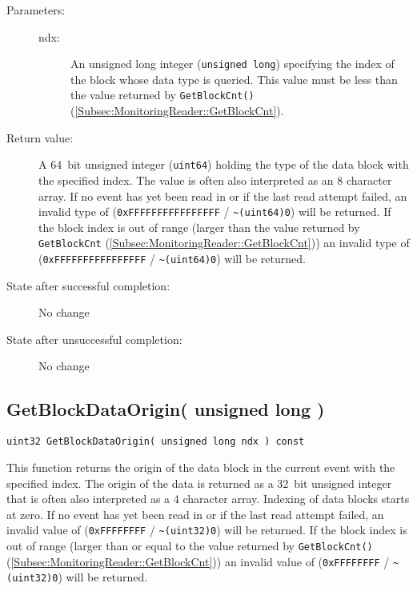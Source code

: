 \documentclass[a4paper,twoside]{article}
\begin{document}
\begin{description}
\item[Parameters:]
	\begin{description}
		\item[ndx:] An unsigned long integer (\texttt{unsigned long}) specifying the index of the block whose data type is queried.
		This value must be less than the value returned by \texttt{GetBlockCnt()} (\ref{Subsec:MonitoringReader::GetBlockCnt}).
	\end{description}
\item[Return value:] A 64~bit unsigned integer (\texttt{uint64}) holding the type of the data block with the specified index. The value is often also interpreted as an 8 
character array.
If no event has yet been read in or if the last read attempt failed, an invalid type of (\texttt{0xFF\-FF\-FF\-FF\-FF\-FF\-FF\-FF} / \texttt{\~{ }(uint64)0}) 
will be returned.
If the block index is out of range (larger than the value returned by \texttt{GetBlockCnt} (\ref{Subsec:MonitoringReader::GetBlockCnt}))
an invalid type of (\texttt{0xFF\-FF\-FF\-FF\-FF\-FF\-FF\-FF} / \texttt{\~{ }(uint64)0}) will be returned.
\item[State after successful completion:] No change
\item[State after unsuccessful completion:] No change
\end{description}


\subsection{GetBlockDataOrigin( unsigned long )}

\texttt{uint32 GetBlockDataOrigin( unsigned long ndx ) const}

This function returns the origin of the data block in the current event with the specified index. The origin of the data is returned as a 32~bit unsigned integer
that is often also interpreted as a 4 character array. 
Indexing of data blocks starts at zero.
If no event has yet been read in or if the last read attempt failed, an invalid value of (\texttt{0xFF\-FF\-FF\-FF} / \texttt{\~{ }(uint32)0}) 
will be returned.
If the block index is out of range (larger than or equal to the value returned by \texttt{GetBlockCnt()} (\ref{Subsec:MonitoringReader::GetBlockCnt})) an 
invalid value of (\texttt{0xFF\-FF\-FF\-FF} / \texttt{\~{ }(uint32)0}) will be returned.
\end{document}
